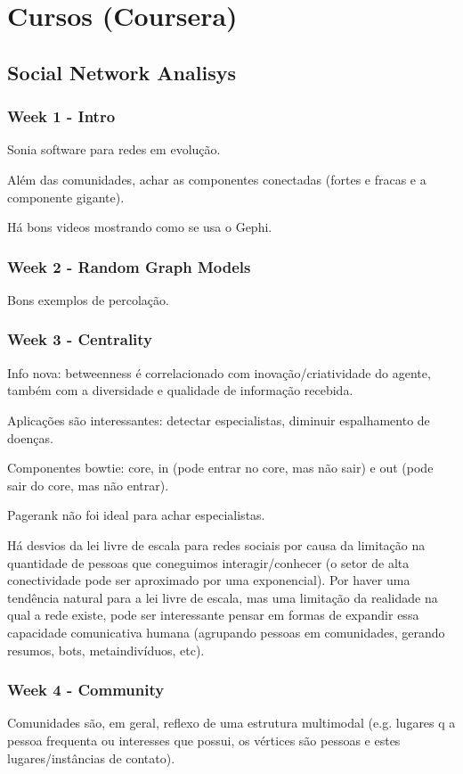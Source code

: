 \documentclass[12pt]{report}
\begin{document}
\chapter{Cursos (Coursera)}
\section{Social Network Analisys}
\subsection{Week 1 - Intro}
Sonia software para redes em evolução.

Além das comunidades, achar as componentes conectadas (fortes e fracas e a componente gigante).

Há bons videos mostrando como se usa o Gephi.
\subsection{Week 2 - Random Graph Models}
Bons exemplos de percolação.
\subsection{Week 3 - Centrality}
Info nova: betweenness é correlacionado com inovação/criatividade do agente, também com a diversidade e qualidade de informação recebida.

Aplicações são interessantes: detectar especialistas, diminuir espalhamento de doenças.

Componentes bowtie: core, in (pode entrar no core, mas não sair) e out (pode sair do core, mas não entrar).

Pagerank não foi ideal para achar especialistas.

Há desvios da lei livre de escala para redes sociais por causa da limitação na quantidade de pessoas que coneguimos interagir/conhecer (o setor de alta conectividade pode ser aproximado por uma exponencial). Por haver uma tendência natural para a lei livre de escala, mas uma limitação da realidade na qual a rede existe, pode ser interessante pensar em formas de expandir essa capacidade comunicativa humana (agrupando pessoas em comunidades, gerando resumos, bots, metaindivíduos, etc).
\subsection{Week 4 - Community}
Comunidades são, em geral, reflexo de uma estrutura multimodal (e.g. lugares q a pessoa frequenta ou interesses que possui, os vértices são pessoas e estes lugares/instâncias de contato).
\end{document}

